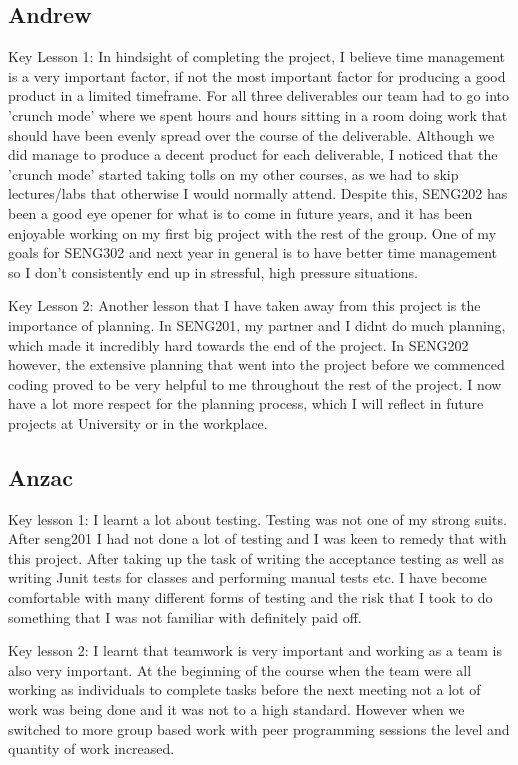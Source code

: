 \subsection{Andrew}
Key Lesson 1:
In hindsight of completing the project, I believe time management is a very important factor, if not the most important factor for producing a good product in a limited timeframe. For all three deliverables our team had to go into 'crunch mode' where we spent hours and hours sitting in a room doing work that should have been evenly spread over the course of the deliverable. Although we did manage to produce a decent product for each deliverable, I noticed that the 'crunch mode' started taking tolls on my other courses, as we had to skip lectures/labs that otherwise I would normally attend. Despite this, SENG202 has been a good eye opener for what is to come in future years, and it has been enjoyable working on my first big project with the rest of the group. One of my goals for SENG302 and next year in general is to have better time management so I don't consistently end up in stressful, high pressure situations.

Key Lesson 2:
Another lesson that I have taken away from this project is the importance of planning. In SENG201, my partner and I didnt do much planning, which made it incredibly hard towards the end of the project. In SENG202 however, the extensive planning that went into the project before we commenced coding proved to be very helpful to me throughout the rest of the project. I now have a lot more respect for the planning process, which I will reflect in future projects at University or in the workplace.

\subsection{Anzac}
Key lesson 1:
I learnt a lot about testing. Testing was not one of my strong suits. After seng201 I had not done a lot of testing and I was keen to remedy that with this project. After taking up the task of writing the acceptance testing as well as writing Junit tests for classes and performing manual tests etc. I have become comfortable with many different forms of testing and the risk that I took to do something that I was not familiar with definitely paid off.

Key lesson 2:
I learnt that teamwork is very important and working as a team is also very important. At the beginning of the course when the team were all working as individuals to complete tasks before the next meeting not a lot of work was being done and it was not to a high standard. However when we switched to more group based work with peer programming sessions the level and quantity of work increased.

